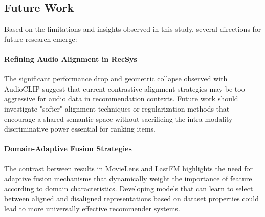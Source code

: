 \subsection{Future Work}
Based on the limitations and insights observed in this study, several directions for future research emerge:

\paragraph{Refining Audio Alignment in RecSys}The significant performance drop and geometric collapse observed with AudioCLIP suggest that current contrastive alignment strategies may be too aggressive for audio data in recommendation contexts. Future work should investigate "softer" alignment techniques or regularization methods that encourage a shared semantic space without sacrificing the intra-modality discriminative power essential for ranking items.

\paragraph{Domain-Adaptive Fusion Strategies}The contrast between results in MovieLens and LastFM highlights the need for adaptive fusion mechanisms that dynamically weight the importance of feature according to domain characteristics. Developing models that can learn to select between aligned and disaligned representations based on dataset properties could lead to more universally effective recommender systems.
